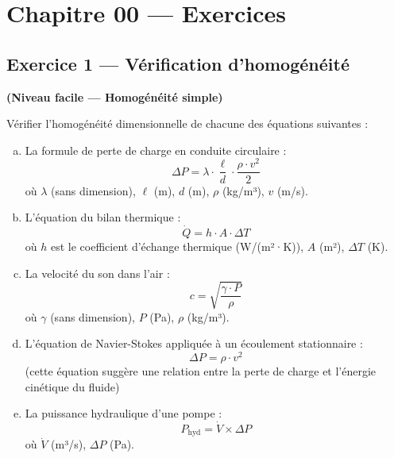 
\section*{Chapitre 00 — Exercices}

\subsection*{Exercice 1 — Vérification d'homogénéité}

\textbf{(Niveau facile — Homogénéité simple)}

Vérifier l'homogénéité dimensionnelle de chacune des équations suivantes :

\begin{enumerate}[a)]
  \item La formule de perte de charge en conduite circulaire :
        \[
          \Delta P = \lambda \cdot \frac{\ell}{d} \cdot \frac{\rho \cdot v^2}{2}
        \]
        où $\lambda$ (sans dimension), $\ell$ (m), $d$ (m), $\rho$ (kg/m³), $v$ (m/s).

  \item L'équation du bilan thermique :
        \[
          \dot{Q} = h \cdot A \cdot \Delta T
        \]
        où $h$ est le coefficient d'échange thermique (W/(m²·K)), $A$ (m²), $\Delta T$ (K).

  \item La velocité du son dans l'air :
        \[
          c = \sqrt{\frac{\gamma \cdot P}{\rho}}
        \]
        où $\gamma$ (sans dimension), $P$ (Pa), $\rho$ (kg/m³).

  \item L'équation de Navier-Stokes appliquée à un écoulement stationnaire :
        \[
          \Delta P = \rho \cdot v^2
        \]
        (cette équation suggère une relation entre la perte de charge et l'énergie cinétique du fluide)

  \item La puissance hydraulique d'une pompe :
        \[
          P_{\text{hyd}} = \dot{V} \times \Delta P
        \]
        où $\dot{V}$ (m³/s), $\Delta P$ (Pa).
\end{enumerate}

